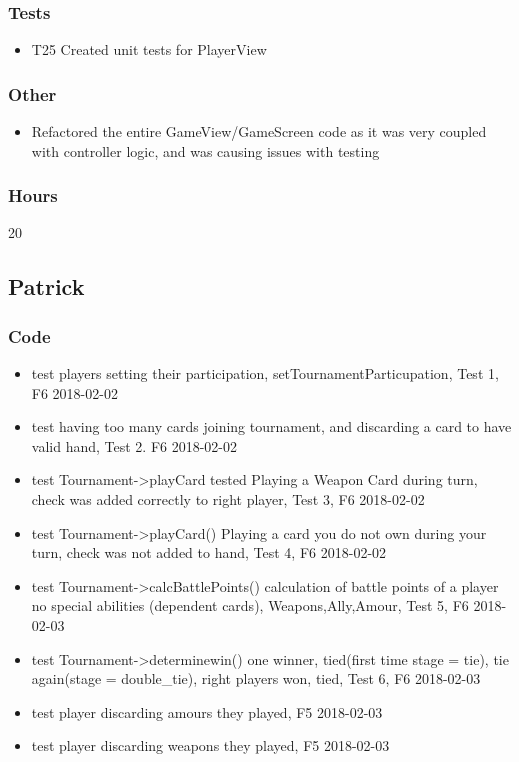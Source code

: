 \documentclass[10pt,a4paper]{article}
\begin{document}
\subsubsection*{Tests}
\begin{itemize}
\item T25 Created unit tests for PlayerView
\end{itemize}
\subsubsection*{Other}
\begin{itemize}
\item Refactored the entire GameView/GameScreen code as it was very coupled with controller logic, and was causing issues with testing
\end{itemize}
\subsubsection*{Hours}
20

\subsection*{Patrick}

\subsubsection*{Code}
\begin{itemize}
\item test players setting their participation, setTournamentParticupation, Test 1, F6 2018-02-02
\item test having too many cards joining tournament, and discarding a card to have valid hand, Test 2. F6 2018-02-02
\item test Tournament->playCard tested Playing a Weapon Card during turn, check was added correctly to right player, Test 3, F6 2018-02-02
\item test Tournament->playCard() Playing a card you do not own during your turn, check was not added to hand, Test 4, F6 2018-02-02
\item test Tournament->calcBattlePoints() calculation of battle points of a player no special abilities (dependent cards), Weapons,Ally,Amour, Test 5, F6 2018-02-03
\item test Tournament->determinewin() one winner, tied(first time stage = tie), tie again(stage = double_tie), right players won, tied, Test 6, F6 2018-02-03
\item test player discarding amours they played, F5 2018-02-03
\item test player discarding weapons they played, F5 2018-02-03
\end{itemize}
\end{document}
